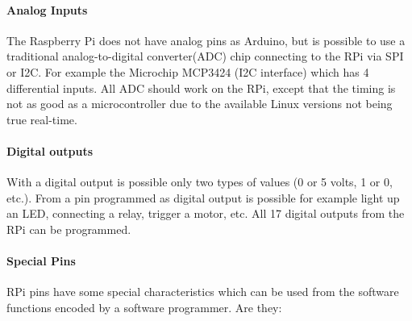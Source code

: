 \documentclass{acm_proc_article-sp}
\begin{document}
\paragraph{Analog Inputs}
The Raspberry Pi does not have analog pins as Arduino, but is possible to use a traditional analog-to-digital converter(ADC) chip connecting to the RPi via SPI or I2C. For example the Microchip MCP3424 (I2C interface) which has 4 differential inputs. All ADC should work on the RPi, except that the timing is not as good as a microcontroller due to the available Linux versions not being true real-time. 

\paragraph{Digital outputs}
With a digital output is possible only two types of values (0 or 5 volts, 1 or 0, etc.). From a pin programmed as digital output is possible for example light up an LED, connecting a relay, trigger a motor, etc. All 17 digital outputs from the RPi can be programmed.

\paragraph{Special Pins}
RPi pins have some special characteristics which can be used from the software functions encoded by a software programmer. Are they:
\end{document}
